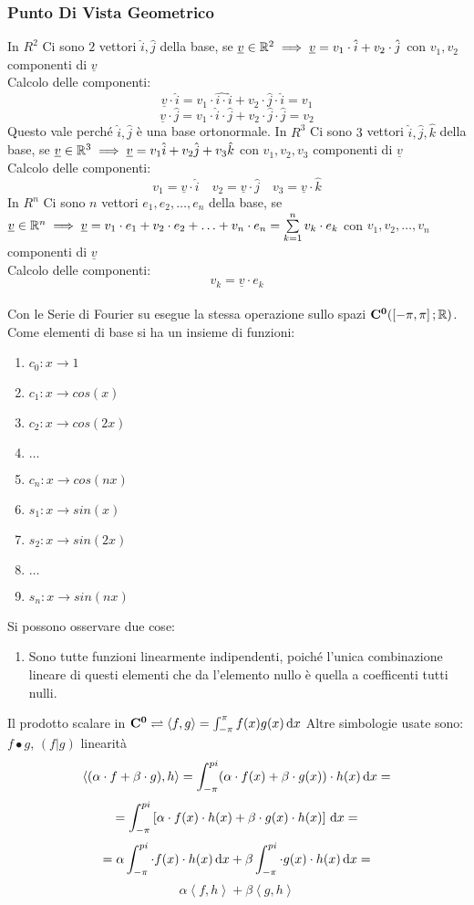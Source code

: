 \subsubsection{Punto Di Vista Geometrico}
In $R^2$ Ci sono $2$ vettori $\hat{i},\hat{j}$ della base, se $\underline{v}\in \mathbb{R}^2 \implies \underline{v}=v_1\cdot \hat{i}+v_2\cdot \hat{j}$ con $v_1,v_2$ componenti di $\underline{v}$\\
Calcolo delle componenti:
\[\underline{v}\cdot \hat{i} = v_1\cdot \hat{i\cdot }\hat{i}+v_2\cdot \hat{j}\cdot \hat{i}=v_1\]
\[\underline{v}\cdot \hat{j} = v_1\cdot \hat{i}\cdot \hat{j}+v_2\cdot \hat{j}\cdot \hat{j}=v_2\]
Questo vale perché $\hat{i},\hat{j}$ è una base ortonormale.
In $R^3$ Ci sono $3$ vettori $\hat{i},\hat{j},\hat{k}$ della base, se $\underline{v}\in \mathbb{R}^3 \implies \underline{v}=v_1\hat{i}+v_2\hat{j}+v_3\hat{k}$ con $v_1,v_2,v_3$ componenti di $\underline{v}$\\
Calcolo delle componenti:
\[ v_1=\underline{v}\cdot \hat{i}\quad v_2=\underline{v}\cdot \hat{j}\quad v_3=\underline{v}\cdot \hat{k}  \]
In $R^n$ Ci sono $n$ vettori $e_1,e_2,\dotsc,e_n$ della base, se $\underline{v}\in \mathbb{R}^n \implies \underline{v}=v_1\cdot e_1+v_2\cdot e_2+\ldots+v_n\cdot e_n=\sum\limits_{k=1}^{n}v_k\cdot e_k$ con $v_1,v_2,\dotsc,v_n$ componenti di $\underline{v}$\\
Calcolo delle componenti:
\[v_k=\underline{v}\cdot e_k\]
\\
Con le Serie di Fourier su esegue la stessa operazione sullo spazi $\mathbf{C^{0}}(\left[-\pi,\pi\right]; \mathbb{R})$. Come elementi di base si ha un insieme di funzioni:
\begin{enumerate}
	\item $c_0:x\to 1$
	\item $c_1:x\to cos(x)$
	\item $c_2:x\to cos(2x)$
	\item $\ldots$
	\item $c_n:x\to cos(nx)$
	\item $s_1:x\to sin(x)$
	\item $s_2:x\to sin(2x)$
	\item $\ldots$
	\item $s_n:x\to sin(nx)$
\end{enumerate}
Si possono osservare due cose:
\begin{enumerate}
	\item Sono tutte funzioni linearmente indipendenti, poiché l'unica combinazione lineare di questi elementi che da l'elemento nullo è quella a coefficenti tutti nulli.
\end{enumerate}
Il prodotto scalare in $\mathbf{C^{0}} \rightleftharpoons \left<f,g\right>=\int_{-\pi}^{\pi}f(x)g(x)\,\mathrm{d}{x}$
Altre simbologie usate sono: $ f\bullet g $, $(f|g)$
\observation linearità
\[\left<(\alpha\cdot f+\beta\cdot g), h \right>= \int_{-\pi}^{pi} (\alpha\cdot f(x)+\beta\cdot g(x))\cdot h(x) \,\mathrm{d}{x}=\]
\[=\int_{-\pi}^{pi} \left[\alpha\cdot f(x)\cdot h(x)+\beta\cdot g(x)\cdot h(x) \right]\,\mathrm{d}{x}= \]
\[=\alpha\int_{-\pi}^{pi} \cdot f(x)\cdot h(x) \,\mathrm{d}{x}+\beta\int_{-\pi}^{pi} \cdot g(x)\cdot h(x) \,\mathrm{d}{x} =\]
\[\alpha\left<f,h\right>+\beta\left<g,h\right>\]

